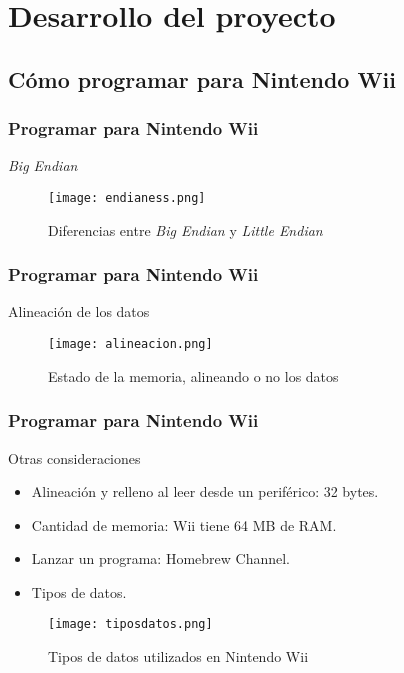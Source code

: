 

\section{Desarrollo del proyecto}

\subsection{Cómo programar para Nintendo Wii}

\begin{frame}	
\frametitle{Programar para Nintendo Wii}
	\begin{block}{\textit{Big Endian}}
		\begin{figure}[H]
			\label{endianess}
			\begin{center}
			\texttt{[image: endianess.png]}
			\end{center}
			\caption{Diferencias entre \textit{Big Endian} y \textit{Little Endian}}
		\end{figure}
	\end{block}
\end{frame}

\begin{frame}	
\frametitle{Programar para Nintendo Wii}
	\begin{block}{Alineación de los datos}
		\begin{figure}[H]
			\label{alineacion}
			\begin{center}
			\texttt{[image: alineacion.png]}
			\end{center}
			\caption{Estado de la memoria, alineando o no los datos}
		\end{figure}
	\end{block}
\end{frame}

\begin{frame}	
\frametitle{Programar para Nintendo Wii}
	\begin{block}{Otras consideraciones}
		\begin{itemize}
		\item Alineación y relleno al leer desde un periférico: 32 bytes.
		\item Cantidad de memoria: Wii tiene 64 MB de RAM.
		\item Lanzar un programa: Homebrew Channel.
		\item Tipos de datos.
		\end{itemize}
		\begin{figure}[H]
			\label{tiposdatos}
			\begin{center}
			\texttt{[image: tiposdatos.png]}
			\end{center}
			\caption{Tipos de datos utilizados en Nintendo Wii}
		\end{figure}
	\end{block}
\end{frame}

